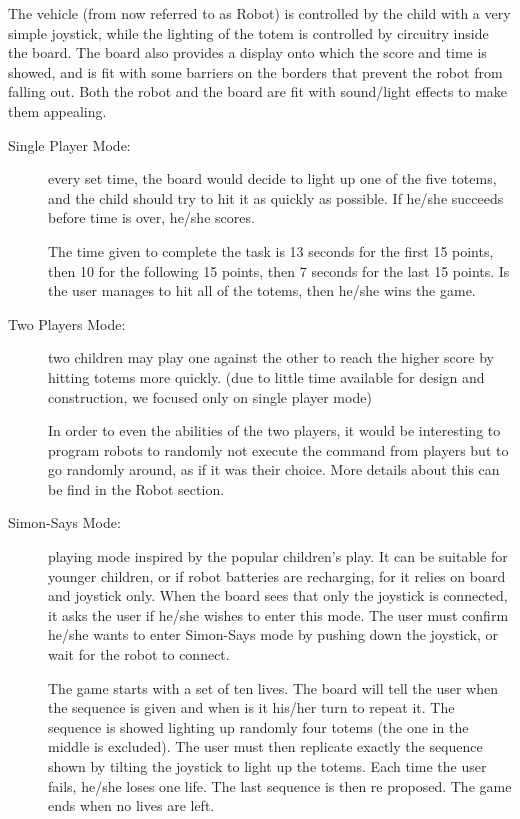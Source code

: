 \documentclass[a4paper,twoside]{book}
\begin{document}
\beforelist* The vehicle (from now referred to as Robot) is controlled by the child with a very simple joystick, while the lighting of the totem is controlled by circuitry inside the board. The board also provides a display onto which the score and time is showed, and is fit with some barriers on the borders that prevent the robot from falling out. Both the robot and the board are fit with sound/light effects to make them appealing.
\begin{description}
\item[Single Player Mode:] every set time, the board would decide to light up one of the five totems, and the child should try to hit it as quickly as possible. If he/she succeeds before time is over, he/she scores.

The time given to complete the task is 13 seconds for the first 15 points, then 10 for the following 15 points, then 7 seconds for the last 15 points. Is the user manages to hit all of the totems, then he/she wins the game.

\item[Two Players Mode:] two children may play one against the other to reach the higher score by hitting totems more quickly.
(due to little time available for  design and construction, we focused only on single player mode)

In order to even the abilities of the two players, it would be interesting to program robots to randomly not execute the command from players but to go randomly around, as if it was their choice. More details about this can be find in the Robot section.

\item[Simon-Says Mode:] playing mode inspired by the popular children's play. It can be suitable for younger children, or if robot batteries are recharging, for it relies on board and joystick only. When the board sees that only the joystick is connected, it asks the user if he/she wishes to enter this mode. The user must confirm he/she wants to enter Simon-Says mode by pushing down the joystick, or wait for the robot to connect. 

The game starts with a set of ten lives. The board will tell the user when the sequence is given and when is it his/her turn to repeat it. The sequence is showed lighting up randomly four totems (the one in the middle is excluded). The user must then replicate exactly the sequence shown by tilting the joystick to light up the totems. Each time the user fails, he/she loses one life. The last sequence is then re proposed.  The game ends when no lives are left.


\end{description}
\end{document}
